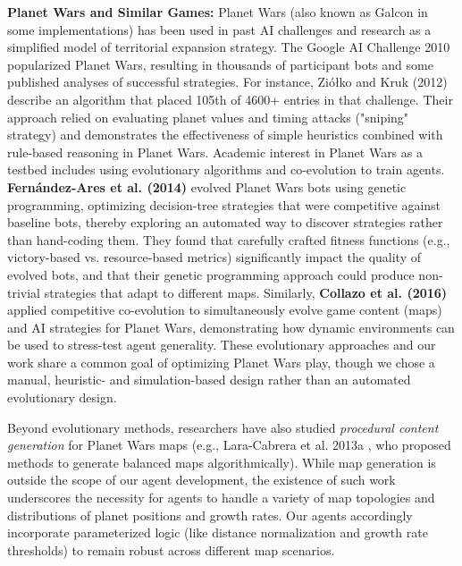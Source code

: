 \documentclass[conference]{IEEEtran}
\begin{document}
\textbf{Planet Wars and Similar Games:} Planet Wars (also known as Galcon in some implementations) has been used in past AI challenges and research as a simplified model of territorial expansion strategy. The Google AI Challenge 2010 popularized Planet Wars, resulting in thousands of participant bots and some published analyses of successful strategies. For instance, Ziółko and Kruk (2012) \cite{ziolko2012} describe an algorithm that placed 105th of 4600+ entries in that challenge. Their approach relied on evaluating planet values and timing attacks ("sniping" strategy) and demonstrates the effectiveness of simple heuristics combined with rule-based reasoning in Planet Wars. Academic interest in Planet Wars as a testbed includes using evolutionary algorithms and co-evolution to train agents. \textbf{Fernández-Ares et al. (2014)} \cite{fernandez2014} evolved Planet Wars bots using genetic programming, optimizing decision-tree strategies that were competitive against baseline bots, thereby exploring an automated way to discover strategies rather than hand-coding them. They found that carefully crafted fitness functions (e.g., victory-based vs. resource-based metrics) significantly impact the quality of evolved bots, and that their genetic programming approach could produce non-trivial strategies that adapt to different maps. Similarly, \textbf{Collazo et al. (2016)} \cite{collazo2016} applied competitive co-evolution to simultaneously evolve game content (maps) and AI strategies for Planet Wars, demonstrating how dynamic environments can be used to stress-test agent generality. These evolutionary approaches and our work share a common goal of optimizing Planet Wars play, though we chose a manual, heuristic- and simulation-based design rather than an automated evolutionary design.

Beyond evolutionary methods, researchers have also studied \textit{procedural content generation} for Planet Wars maps (e.g., Lara-Cabrera et al. 2013a \cite{lara2013a}, who proposed methods to generate balanced maps algorithmically). While map generation is outside the scope of our agent development, the existence of such work underscores the necessity for agents to handle a variety of map topologies and distributions of planet positions and growth rates. Our agents accordingly incorporate parameterized logic (like distance normalization and growth rate thresholds) to remain robust across different map scenarios.
\end{document}
